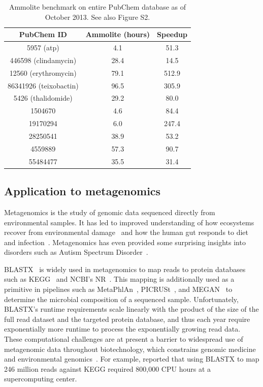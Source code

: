 \documentclass[review,preprint,12pt]{elsarticle}
\renewcommand{\cite}{\citep} %
\theoremstyle{definition}
\theoremstyle{remark}
\numberwithin{equation}{section}
\begin{document}
\begin{table}
\begin{subtable}{1\textwidth}
\caption{Ammolite benchmark on entire PubChem database as of October 2013. See also Figure S2.}
\label{ammo47m}
\begin{tabular}{ccc}
\hline
PubChem ID & Ammolite (hours) & Speedup \\
\hline
5957 (atp) & 4.1 & 51.3 \\
\hline
446598 (clindamycin) & 28.4 & 14.5 \\
\hline
12560 (erythromycin) & 79.1 & 512.9 \\
\hline
86341926 (teixobactin) & 96.5 & 305.9 \\
\hline
5426 (thalidomide) & 29.2 & 80.0 \\
\hline
1504670 & 4.6 & 84.4 \\
\hline
19170294 & 6.0 & 247.4 \\
\hline
28250541 & 38.9 & 53.2\\
\hline
4559889 & 57.3 & 90.7 \\
\hline
55484477 & 35.5 & 31.4 \\
\hline
\end{tabular}
\end{subtable}
\end{table}

\subsection{Application to metagenomics}

Metagenomics is the study of genomic data sequenced directly from environmental
samples.
It has led to improved understanding of how ecosystems recover
from environmental damage~\cite{tyson2004community} and how the human gut responds 
to diet
and infection~\cite{david2014host}.
Metagenomics has even provided some surprising insights into disorders 
such as Autism Spectrum Disorder~\cite{macfabe2012short}.

BLASTX~\cite{altschul1990basic} is widely used in metagenomics to map
reads to protein databases such as KEGG~\cite{kanehisa2000kegg} and NCBI's 
NR~\cite{sayers2011database}.
This mapping is additionally used as a primitive in pipelines such as MetaPhlAn~\cite{segata2012metagenomic}, 
PICRUSt~\cite{langille2013predictive}, and MEGAN~\cite{huson2011integrative} to
determine the microbial composition of a sequenced sample.
Unfortunately, BLASTX's runtime requirements scale linearly with the product 
of the size of the full read dataset and the targeted protein database, and 
thus each year require exponentially more runtime to process the exponentially 
growing read data. 
These computational challenges are at present a barrier to widespread use of 
metagenomic data throughout biotechnology, which constrains genomic medicine 
and environmental genomics~\cite{frank2008gastrointestinal}.
For example, \citet{mackelprang2011metagenomic} reported that using BLASTX to map 246
million reads against KEGG required 800,000 CPU hours at a supercomputing 
center.
\end{document}
